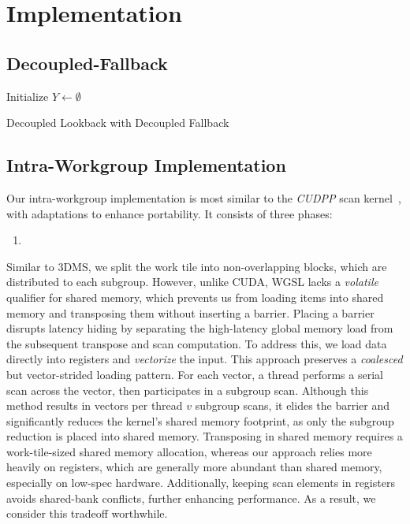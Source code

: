 \documentclass[sigconf]{acmart}
\begin{document}
\section{Implementation}

\subsection{Decoupled-Fallback}

\begin{algorithm}[htbp]
  \SetAlgoLined
  Initialize $Y \leftarrow \emptyset$\;
  \;
  \caption{Decoupled Lookback with Decoupled Fallback}
  \label{alg:example}
\end{algorithm}

\subsection{Intra-Workgroup Implementation}
Our intra-workgroup implementation is most similar to the \emph{CUDPP} scan kernel~\cite{}, with adaptations to enhance portability. It consists of three phases:
\begin{enumerate}
  \item
\end{enumerate}

Similar to 3DMS, we split the work tile into non-overlapping blocks, which are distributed to each subgroup. However, unlike CUDA, WGSL lacks a \emph{volatile} qualifier for shared memory, which prevents us from loading items into shared memory and transposing them without inserting a barrier. Placing a barrier disrupts latency hiding by separating the high-latency global memory load from the subsequent transpose and scan computation. To address this, we load data directly into registers and \emph{vectorize} the input. This approach preserves a \emph{coalesced} but vector-strided loading pattern. For each vector, a thread performs a serial scan across the vector, then participates in a subgroup scan. Although this method results in vectors per thread $v$ subgroup scans, it elides the barrier and significantly reduces the kernel's shared memory footprint, as only the subgroup reduction is placed into shared memory. Transposing in shared memory requires a work-tile-sized shared memory allocation, whereas our approach relies more heavily on registers, which are generally more abundant than shared memory, especially on low-spec hardware. Additionally, keeping scan elements in registers avoids shared-bank conflicts, further enhancing performance. As a result, we consider this tradeoff worthwhile.
\end{document}
